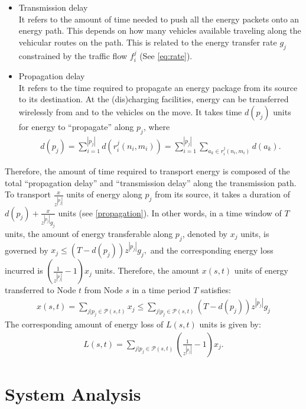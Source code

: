 \documentclass[journal]{IEEEtran}
\begin{document}
\begin{itemize}
	\item Transmission delay\\
	It refers to the amount of time needed to push all the energy packets onto an energy path. This depends on how many vehicles available traveling along the vehicular routes on the path. This is related to the energy transfer rate $g_j$ constrained by the traffic flow $f_i^j$ (See \eqref{eq:rate}).
	\item Propagation delay \\
	It refers to the time required to propagate an energy package from its source to its destination.
	At the (dis)charging facilities, energy can be transferred wirelessly from and to the vehicles on the move. 
It takes  time $d(p_j)$ units for energy to ``propagate'' along $p_j$, where
\begin{align} \label{propagation}
		d(p_j) = \sum_{i=1}^{|p_j|}d(r_i^j(n_i,m_i)) = \sum_{i=1}^{|p_j|}\sum_{a_k\in r_i^j(n_i,m_i)}d(a_k).
\end{align}
\end{itemize}


Therefore, the amount of time required to transport energy is composed of the total ``propagation delay'' and ``transmission delay'' along the transmission path. To transport $\frac{x}{z^{|p_j|}}$ units of energy along $p_j$ from its source, it takes a duration of $d(p_j)+\frac{x}{z^{|p_j|}g_j}$ units (see \eqref{propagation}). In other words, in a time window of $T$ units, the amount of energy transferable along $p_j$, denoted by $x_j$ units, is governed by $x_j\leq (T-d(p_j))z^{|p_j|}g_j,$ and the corresponding energy loss incurred is $(\frac{1}{z^{|p_j|}}-1)x_j$ units.
Therefore, the amount $x(s,t)$ units of energy transferred to Node $t$ from Node $s$ in a time period $T$ satisfies:
\begin{align}
x(s,t) = \sum_{j|p_j\in \mathcal{P}(s,t)}{x_j} \leq 
\sum_{j|p_j\in \mathcal{P}(s,t)}{(T-d(p_j))z^{|p_j|}g_j}
\label{transferredEnergy}
\end{align}
The corresponding amount of energy loss of $L(s,t)$ units is given by:
\begin{align}
	L(s,t) = \sum_{j|p_j\in \mathcal{P}(s,t)}{(\frac{1}{z^{|p_j|}}-1)   x_j}.
	\label{energyLoss}
\end{align}


\section{System Analysis} \label{sec:formulation}
\end{document}
